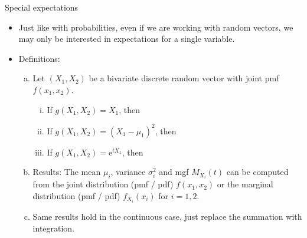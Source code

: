 \documentclass{article}
\newcommand{\e}{\mathrm{e}}		%
\begin{document}
Special expectations\bigskip
\begin{itemize}
    \item Just like with probabilities, even if we are working with random vectors, we may only be interested in expectations for a single variable.
    \item Definitions:
    \begin{enumerate}[(a)]
        \item Let $(X_1,X_2)$ be a bivariate discrete random vector with joint pmf $f(x_1,x_2)$.
        \begin{enumerate}[i)]
            \item If $g(X_1,X_2) = X_1$, then\vspace{100pt}
            \item If $g(X_1,X_2) = (X_1 - \mu_1)^2$, then\vspace{80pt}
            \item If $g(X_1,X_2) = \e^{tX_1}$, then\vspace{80pt}
        \end{enumerate}
        \item[] Results: The mean $\mu_i$, variance $\sigma^2_i$ and mgf $M_{X_i}(t)$ can be computed from the joint distribution (pmf / pdf) $f(x_1,x_2)$ or the marginal distribution (pmf / pdf) $f_{X_i}(x_i)$ for $i = 1,2$.\smallskip
        \item Same results hold in the continuous case, just replace the summation with integration.
    \end{enumerate}
\end{itemize}\bigskip

\newpage%
\end{document}
